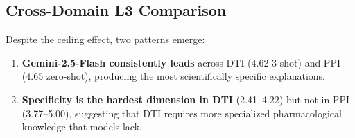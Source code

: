 \subsection{Cross-Domain L3 Comparison}

Despite the ceiling effect, two patterns emerge:
\begin{enumerate}[nosep,leftmargin=*]
    \item \textbf{Gemini-2.5-Flash consistently leads} across DTI (4.62 3-shot) and PPI (4.65 zero-shot), producing the most scientifically specific explanations.
    \item \textbf{Specificity is the hardest dimension in DTI} (2.41--4.22) but not in PPI (3.77--5.00), suggesting that DTI requires more specialized pharmacological knowledge that models lack.
\end{enumerate}
